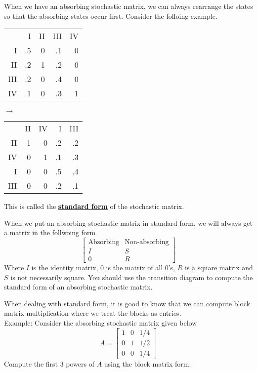 \documentclass[14,fleqn]{article}
\newcommand{\defn}[1]{\textbf{\underline{#1}}}
\begin{document}
When we have an absorbing stochastic matrix, we can always rearrange the states so that the absorbing states occur first. Consider the folloing example.\\
\begin{tabular}{rrrrr}
	&I&II&III&IV\\
	I&.5&0&.1&0\\
	II&.2&1&.2&0\\
	III&.2&0&.4&0\\
	IV&.1&0&.3&1
\end{tabular}
$\longrightarrow$
\begin{tabular}{rrrrr}
	&II&IV&I&III\\
	II&1&0&.2&.2\\
	IV&0&1&.1&.3\\
	I&0&0&.5&.4\\
	III&0&0&.2&.1
\end{tabular}
This is called the \defn{standard form} of the stochastic matrix.

When we put an absorbing stochastic matrix in standard form, we will always get a matrix in the follwoing form
\[
	\left[\begin{array}{c|c}\text{Absorbing}&\text{Non-absorbing}\\I&S\\\hline 0&R\end{array}\right]
\]
Where $I$ is the identity matrix, $0$ is the matrix of all 0's, $R$ is a square matrix and $S$ is not necessarily square. You should use the transition diagram to compute the standard form of an absorbing stochastic matrix.

When dealing with standard form, it is good to know that we can compute block matrix multiplication where we treat the blocks as entries.\\
Example: Consider the absorbing stochastic matrix given below
\[
	A=\begin{bmatrix}1&0&1/4\\0&1&1/2\\0&0&1/4\end{bmatrix}
\]
Compute the first 3 powers of $A$ using the block matrix form.
\end{document}
